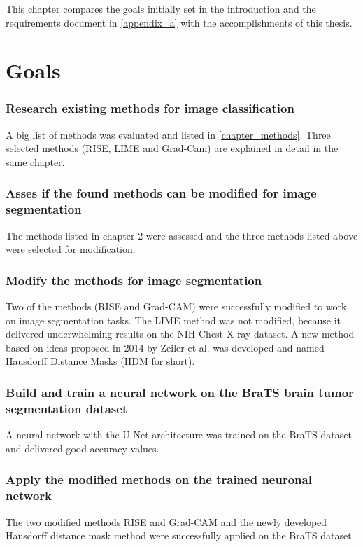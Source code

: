 This chapter compares the goals initially set in the introduction and the requirements document in \autoref{appendix_a}  with the accomplishments of this thesis.

\section{Goals}

\subsubsection{Research existing methods for image classification}
A big list of methods was evaluated and listed in \autoref{chapter_methods}. Three selected methods (RISE, LIME and Grad-Cam) are explained in detail in the same chapter.

\subsubsection{Asses if the found methods can be modified for image segmentation}
The methods listed in chapter 2 were assessed and the three methods listed above were selected for modification.

\subsubsection{Modify the methods for image segmentation}
Two of the methods (RISE and Grad-CAM) were successfully modified to work on image segmentation tasks.
The LIME method was not modified, because it delivered underwhelming results on the NIH Chest X-ray dataset.
A new method based on ideas proposed in 2014 by Zeiler et al.\cite{zeiler2014visualizing} was developed and named Hausdorff Distance Masks (HDM for short).

\subsubsection{Build and train a neural network on the BraTS brain tumor segmentation dataset}
A neural network with the U-Net architecture was trained on the BraTS dataset and delivered good accuracy values.

\subsubsection{Apply the modified methods on the trained neuronal network}
The two modified methods RISE and Grad-CAM and the newly developed Hausdorff distance mask method were successfully applied on the BraTS dataset.

